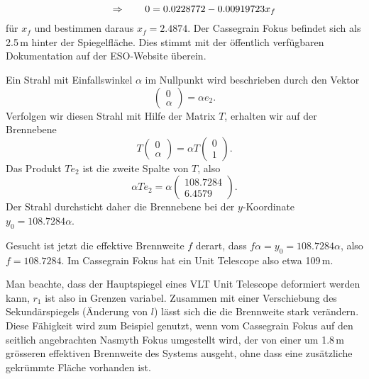 \begin{loesung}
\begin{teilaufgaben}
\[\qquad\Rightarrow\qquad
0=
 0.0228772 - 0.00919723 x_f\\
\]
für $x_f$ und bestimmen daraus $x_f=2.4874$.
Der Cassegrain Fokus befindet sich als 2.5\,m hinter der Spiegelfläche.
Dies stimmt mit der öffentlich verfügbaren Dokumentation auf der ESO-Website
überein.
\item
Ein Strahl mit Einfallswinkel $\alpha$ im Nullpunkt wird beschrieben
durch den Vektor
\[
\begin{pmatrix}0\\\alpha\end{pmatrix}
=
\alpha e_2
.
\]
Verfolgen wir diesen Strahl mit Hilfe der Matrix $T$, erhalten wir auf
der Brennebene
\[
T\begin{pmatrix}0\\\alpha\end{pmatrix}
=
\alpha T\begin{pmatrix}0\\1\end{pmatrix}.
\]
Das Produkt $Te_2$ ist die zweite Spalte von $T$, also
\[
\alpha Te_2
=
\alpha
\left(
\begin{array}{r}
108.7284\\
  6.4579
\end{array}\right).
\]
Der Strahl durchsticht daher die Brennebene bei der $y$-Koordinate
$y_0=108.7284\alpha$.
\item
Gesucht ist jetzt die effektive Brennweite $f$ derart, dass 
$f\alpha=y_0= 108.7284\alpha$, also $f=108.7284$.
Im Cassegrain Fokus hat ein Unit Telescope also etwa 109\,m. 
\qedhere
\end{teilaufgaben}
\end{loesung}

\begin{diskussion}
Man beachte, dass der Hauptspiegel eines VLT Unit Telescope deformiert
werden kann, $r_1$ ist also in Grenzen variabel.
Zusammen mit einer Verschiebung des Sekundärspiegels (Änderung von $l$)
lässt sich die die Brennweite stark verändern.
Diese Fähigkeit wird zum Beispiel genutzt, wenn vom Cassegrain Fokus
auf den seitlich angebrachten Nasmyth Fokus umgestellt wird, der
von einer um 1.8\,m grösseren effektiven Brennweite des Systems ausgeht,
ohne dass eine zusätzliche gekrümmte Fläche vorhanden ist.
\end{diskussion}
\egroup

